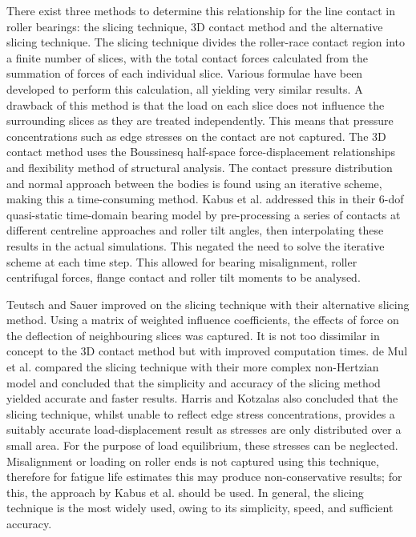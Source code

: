 There exist three methods to determine this relationship for the line contact in roller bearings: the slicing technique, 3D contact method and the alternative slicing technique. The slicing technique \cite{Andreason1973} divides the roller-race contact region into a finite number of slices, with the total contact forces calculated from the summation of forces of each individual slice. Various formulae have been developed to perform this calculation, all yielding very similar results. A drawback of this method is that the load on each slice does not influence the surrounding slices as they are treated independently. This means that pressure concentrations such as edge stresses on the contact are not captured. The 3D contact method uses the Boussinesq half-space force-displacement relationships and flexibility method of structural analysis. The contact pressure distribution and normal approach between the bodies is found using an iterative scheme, making this a time-consuming method. Kabus et al. \cite{Kabus2012} addressed this in their 6-dof quasi-static time-domain bearing model  by pre-processing a series of contacts at different centreline approaches  and roller tilt angles, then interpolating these results in the actual simulations. This negated the need to solve the iterative scheme at each time step. This allowed for bearing misalignment, roller centrifugal forces, flange contact and roller tilt moments to be analysed. 

Teutsch and Sauer \cite{Teutsch2004} improved on the slicing technique with their alternative slicing method. Using a matrix of weighted influence coefficients, the effects of force on the deflection of neighbouring slices was captured. It is not too dissimilar in concept to the 3D contact method but with improved computation times. de Mul et al. \cite{DeMul1989_2} compared the slicing technique with their more complex non-Hertzian model and concluded that the simplicity and accuracy of the slicing method yielded accurate and faster results. Harris and Kotzalas \cite{Harris2007} also concluded that the slicing technique, whilst unable to reflect edge stress concentrations, provides a suitably accurate load-displacement result as stresses are only distributed over a small area. For the purpose of load equilibrium, these stresses can be neglected. Misalignment or loading on roller ends is not captured using this technique, therefore for fatigue life estimates this may produce non-conservative results; for this, the approach by Kabus et al. should be used. In general, the slicing technique is the most widely used, owing to its simplicity, speed, and sufficient accuracy.

